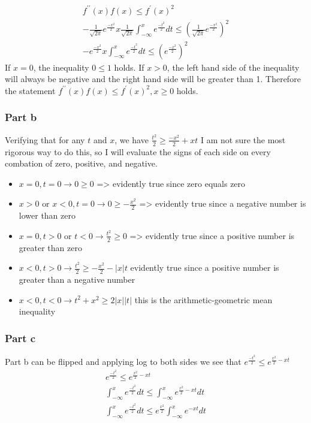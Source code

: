 \begin{gather}
  f^{\prime \prime}(x) f(x) \leq f^\prime(x)^2 \\
  - \frac{1}{\sqrt{2\pi}} e^\frac{-x^2}{2}x \frac{1}{\sqrt{2\pi}} \int_{-\infty}^{x} e^\frac{-t^2}{2}dt \leq  (\frac{1}{\sqrt{2\pi}} e^\frac{-x^2}{2})^2 \\
  -e^\frac{-x^2}{2}x \int_{-\infty}^{x} e^\frac{-t^2}{2}dt \leq (e^\frac{-x^2}{2})^2
\end{gather}
If $x= 0$, the inequality $0 \leq 1$ holds. If $x > 0$, the left hand side of the inequality will always be negative and the right hand side will be greater than 1. Therefore the statement $f^{\prime \prime}(x) f(x) \leq f^\prime(x)^2, x \geq 0$ holds.
\subsubsection{Part b}
Verifying that for any $t$ and $x$, we have $\frac{t^2}{2} \geq \frac{-x^2}{2}+xt$
I am not sure the most rigorous way to do this, so I will evaluate the signs of each side on every combation of zero, positive, and negative.
\begin{itemize}
  \item $x=0, t=0 \to 0 \geq 0$ => evidently true since zero equals zero
  \item $x>0 \text{ or } x<0, t=0 \to 0 \geq -\frac{x^2}{2}$ => evidently true since a negative number is lower than zero
  \item $x=0, t>0 \text{ or } t<0 \to \frac{t^2}{2}\geq 0$ => evidently true since a positive number is greater than zero
  \item $x<0, t> 0 \to \frac{t^2}{2} \geq -\frac{x^2}{2} - |x| t$ evidently true since a positive number is greater than a negative number
  \item $x<0, t<0 \to t^2 +x^2 \geq 2|x| |t|$ this is the arithmetic-geometric mean inequality 
\end{itemize}

\subsubsection{Part c}
Part b can be flipped and applying log to both sides we see that $e^\frac{-t^2}{2} \leq e^{\frac{x^2}{2}-xt}$
\begin{gather}
  e^\frac{-t^2}{2} \leq e^{\frac{x^2}{2}-xt} \\
  \int_{-\infty}^{x} e^\frac{-t^2}{2}dt \leq \int_{-\infty}^{x}e^{\frac{x^2}{2}-xt} dt \\ 
  \int_{-\infty}^{x} e^\frac{-t^2}{2}dt \leq e^{\frac{x^2}{2}}\int_{-\infty}^{x}e^{-xt} dt
\end{gather}

